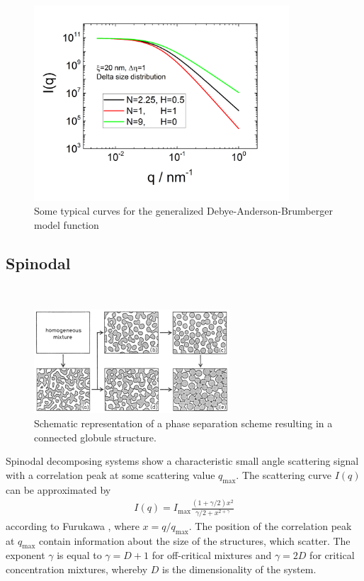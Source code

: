 \begin{figure}[htb]
\begin{center}
\includegraphics[width=0.85\textwidth,height=0.6\textwidth]{../images/form_factor/nonparticular/gDAB.png}
\end{center}
\caption{Some typical curves for the generalized Debye-Anderson-Brumberger model function} \label{fig:gDABIq}
\end{figure}


\clearpage
\subsection{Spinodal}
\label{sect:Spinodal}
~\\

\begin{figure}[htb]
\begin{center}
\includegraphics[width=0.648\textwidth,height=0.345\textwidth]{spinodal2.png}
\end{center}
\caption{Schematic representation of a phase separation scheme
resulting in a connected globule structure.} \label{Spinodal}
\end{figure}

Spinodal decomposing systems show a characteristic small angle
scattering signal with a correlation peak at some scattering value
$q_\text{max}$. The scattering curve $I(q)$ can be approximated by
\begin{align}
I(q) = I_\text{max} \frac{(1+\gamma/2)x^2}{\gamma/2+x^{2+\gamma}}
\end{align}
according to Furukawa \cite{Furukawa1984}, where $x=q/q_\text{max}$.
The position of the correlation peak at $q_\text{max}$ contain
information about the size of the structures, which scatter. The
exponent $\gamma$ is equal to $\gamma=D+1$ for off-critical mixtures
and $\gamma=2D$ for critical concentration mixtures, whereby $D$ is
the dimensionality of the system.

